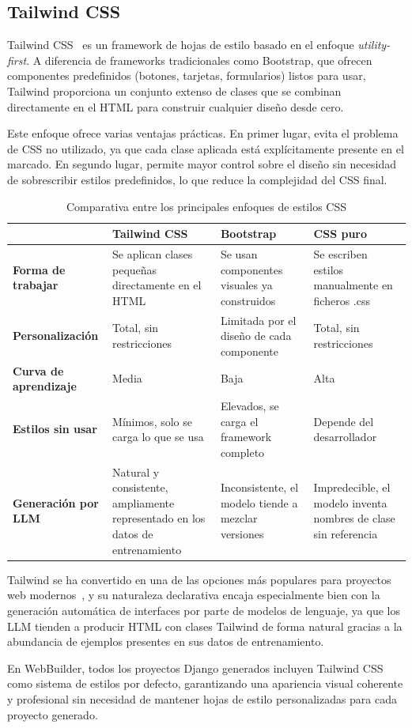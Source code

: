 \subsection{Tailwind CSS}
\label{subsec:tailwind}

Tailwind CSS~\cite{tailwind_docs} es un framework de hojas de estilo basado en el enfoque \emph{utility-first}. A diferencia de frameworks tradicionales como  Bootstrap, que ofrecen componentes predefinidos (botones, tarjetas, formularios) listos para usar, Tailwind proporciona un conjunto extenso de clases  que se combinan directamente en el HTML para construir cualquier diseño desde cero.

Este enfoque ofrece varias ventajas prácticas. En primer lugar, evita el problema de CSS no utilizado, ya que cada clase aplicada está explícitamente presente en el marcado. En segundo lugar, permite mayor control sobre el diseño sin necesidad de sobrescribir estilos predefinidos, lo que reduce la complejidad del CSS final.

\begin{table}[H]
\centering
\begin{tabular}{|p{4cm}|p{3.5cm}|p{3.5cm}|p{3.5cm}|}
    \hline
    & \textbf{Tailwind CSS} & \textbf{Bootstrap} & \textbf{CSS puro} \\
    \hline
    \textbf{Forma de trabajar} & Se aplican clases pequeñas directamente en el HTML & Se usan componentes visuales ya construidos & Se escriben estilos manualmente en ficheros .css \\
    \hline
    \textbf{Personalización} & Total, sin restricciones & Limitada por el diseño de cada componente & Total, sin restricciones \\
    \hline
    \textbf{Curva de aprendizaje} & Media & Baja & Alta \\
    \hline
    \textbf{Estilos sin usar} & Mínimos, solo se carga lo que se usa & Elevados, se carga el framework completo & Depende del desarrollador \\
    \hline
    \textbf{Generación por LLM} & Natural y consistente, ampliamente representado en los datos de entrenamiento & Inconsistente, el modelo tiende a mezclar versiones & Impredecible, el modelo inventa nombres de clase sin referencia \\
    \hline
\end{tabular}
\caption{Comparativa entre los principales enfoques de estilos CSS}

\label{tab:comparativa-css}
\end{table}

Tailwind se ha convertido en una de las opciones más populares para proyectos 
web modernos~\cite{stackoverflow_survey_2025}, y su naturaleza declarativa encaja 
especialmente bien con la generación automática de interfaces por parte de modelos 
de lenguaje, ya que los LLM tienden a producir HTML con clases Tailwind de forma 
natural gracias a la abundancia de ejemplos presentes en sus datos de entrenamiento.

En WebBuilder, todos los proyectos Django generados incluyen Tailwind CSS como 
sistema de estilos por defecto, garantizando una apariencia visual coherente 
y profesional sin necesidad de mantener hojas de estilo personalizadas para 
cada proyecto generado.